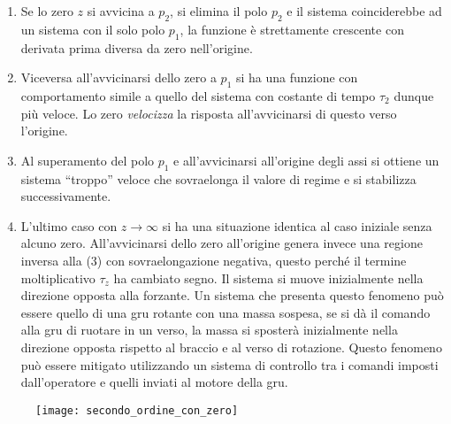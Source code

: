  \begin{figure}[h]
 \centering
\end{figure}

\begin{enumerate}
\item Se lo zero $z$ si avvicina a $p_2$, si elimina il polo $p_2$ e il sistema
coinciderebbe ad un sistema con il solo polo $p_1$, la funzione è strettamente
crescente con derivata prima diversa da zero nell'origine.

\item Viceversa all'avvicinarsi dello zero a $p_1$ si ha una funzione con
comportamento simile a quello del sistema con costante di tempo $\tau_2$ dunque
più veloce.
Lo zero \textit{velocizza} la risposta all'avvicinarsi di questo verso
l'origine.

\item Al superamento del polo $p_1$ e all'avvicinarsi all'origine degli assi si
ottiene un sistema ``troppo'' veloce che sovraelonga il valore di regime e si
stabilizza successivamente.

\item L'ultimo caso con $z\to \infty$ si ha una situazione identica al caso
iniziale senza alcuno zero.
All'avvicinarsi dello zero all'origine genera invece una regione inversa alla
(3) con sovraelongazione negativa, questo perché il termine
moltiplicativo $\tau_z$ ha cambiato segno. Il sistema si muove inizialmente
nella direzione opposta alla forzante.
Un sistema che presenta questo fenomeno può essere quello di una gru rotante
con una massa sospesa, se si dà il comando alla gru di ruotare in un
verso, la massa si sposterà inizialmente nella direzione opposta rispetto al
braccio e al verso di rotazione.
Questo fenomeno può essere mitigato utilizzando un sistema di controllo tra i
comandi imposti dall'operatore e quelli inviati al motore della gru.
\end{enumerate}
\begin{figure}[h]
\centering
\texttt{[image: secondo\_ordine\_con\_zero]}
\end{figure}

